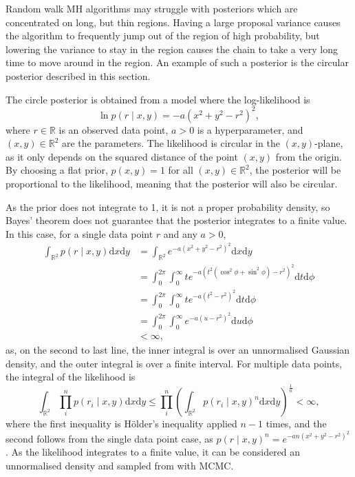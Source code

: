 \documentclass[english,twoside,openright]{HYgraduMLDS}
\newcommand{\R}{\mathbb{R}}
\newcommand{\dx}{\mathrm{d}}
\begin{document}
Random walk MH algorithms may struggle with posteriors which are concentrated
on long, but thin regions. Having a large proposal variance causes the algorithm
to frequently jump out of the region of high probability, but lowering the
variance to stay in the region causes the chain to take a very long time to move
around in the region. An example of such a posterior is the circular posterior
described in this section.

The circle posterior is obtained from a model where the log-likelihood is
\[
    \ln p(r\mid x, y) = -a(x^2 + y^2 - r^2)^2,
\]
where \(r\in \R\) is an observed data point, \(a > 0\) is a hyperparameter,
and \((x, y)\in \R^{2}\) are the parameters.
The likelihood is circular in the \((x, y)\)-plane, as it only depends on the
squared distance of the point \((x, y)\) from the origin. By choosing a flat
prior, \(p(x, y) = 1\) for all \((x, y)\in \R^{2}\), the posterior will be
proportional to the likelihood, meaning that the posterior will also be circular.

As the prior does not integrate to 1, it is not a proper probability density,
so Bayes' theorem does not guarantee that the posterior integrates to a finite
value. In this case, for a single data point \(r\) and any \(a > 0\),
\begin{align*}
  \int_{\R^{2}}p(r\mid x, y)\dx x\dx y
  &= \int_{\R^{2}}e^{-a(x^{2} + y^{2} - r^{2})^{2}}\dx x\dx y
  \\&= \int_{0}^{2\pi}\int_{0}^{\infty}
  te^{-a(t^{2}(\cos^{2} \phi + \sin^{2} \phi) - r^{2})^{2}} \dx t\dx \phi
  \\&= \int_{0}^{2\pi} \int_{0}^{\infty} te^{-a(t^{2} - r^{2})^{2}}\dx t\dx \phi
  \\&= \int_{0}^{2\pi} \int_{0}^{\infty} e^{-a(u - r^{2})^{2}}\dx u\dx \phi
  \\&< \infty,
\end{align*}
as, on the second to last line, the inner integral is over an unnormalised
Gaussian density, and
the outer integral is over a finite interval. For multiple data points, the
integral of the likelihood is
\[
  \int_{\R^{2}}\prod_{i}^{n}p(r_{i}\mid x,y)\dx x\dx y
  \leq \prod_{i}^{n}\left(\int_{\R^{2}}p(r_{i}\mid x,y)^{n}\dx x\dx y\right)^{\frac{1}{n}}
  < \infty,
\]
where the first inequality is Hölder's inequality applied \(n - 1\) times,
and the second follows from the single data point case, as
\(p(r\mid x,y)^{n} = e^{-an(x^{2} + y^{2} - r^{2})^{2}}\).
As the likelihood integrates to a
finite value, it can be considered an unnormalised density and sampled from
with MCMC.
\end{document}
